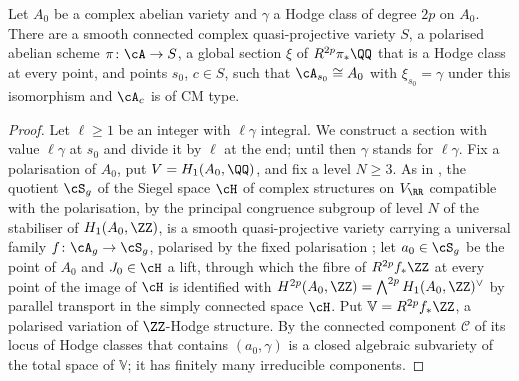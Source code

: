 \begin{proposition}\label{prop:cmfamily}
Let $A_{0}$ be a complex abelian variety and $\gamma$ a Hodge class of degree
$2p$ on $A_{0}$. There are a smooth connected complex quasi-projective variety
$S$, a polarised abelian scheme $\pi\colon\cA\to S$, a global section $\xi$ of
$R^{2p}\pi_{*}\QQ$ that is a Hodge class at every point, and points $s_{0}$,
$c\in S$, such that $\cA_{s_{0}}\cong A_{0}$ with $\xi_{s_{0}}=\gamma$ under
this isomorphism and $\cA_{c}$ is of CM type.
\end{proposition}

\begin{proof}
Let $\ell\ge1$ be an integer with $\ell\gamma$ integral. We construct a
section with value $\ell\gamma$ at $s_{0}$ and divide it by $\ell$ at the
end; until then $\gamma$ stands for $\ell\gamma$. Fix a polarisation of
$A_{0}$, put $V=H_{1}(A_{0},\QQ)$, and fix a level $N\ge3$. As in \cite[Setup~16.1]{paperI}, the
quotient $\cS_{g}$ of the Siegel space $\cH$ of complex structures on
$V_{\RR}$ compatible with the polarisation, by the principal congruence
subgroup of level $N$ of the stabiliser of $H_{1}(A_{0},\ZZ)$, is a smooth
quasi-projective variety carrying a universal family $f\colon\cA_{g}\to\cS_{g}$,
polarised by the fixed polarisation \cite{BB66}; let $a_{0}\in\cS_{g}$ be the
point of $A_{0}$ and $J_{0}\in\cH$ a lift, through which the fibre of
$R^{2p}f_{*}\ZZ$ at every point of the image of $\cH$ is identified with
$H^{2p}(A_{0},\ZZ)=\bigwedge^{2p}H_{1}(A_{0},\ZZ)^{\vee}$ by parallel
transport in the simply connected space $\cH$. Put
$\mathbb{V}=R^{2p}f_{*}\ZZ$, a polarised variation of $\ZZ$-Hodge
structure. By \cite[Theorem~B.6]{paperI} the connected component $\mathcal{C}$ of its
locus of Hodge classes that contains $(a_{0},\gamma)$ is a closed algebraic
subvariety of the total space of $\mathbb{V}$; it has finitely many
irreducible components.


\end{proof}
